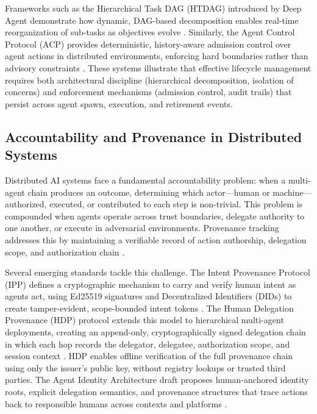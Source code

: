 Frameworks such as the Hierarchical Task DAG (HTDAG) introduced by Deep Agent demonstrate how dynamic, DAG-based decomposition enables real-time reorganization of sub-tasks as objectives evolve \cite{zhang_etal_2025_deepagent}. Similarly, the Agent Control Protocol (ACP) provides deterministic, history-aware admission control over agent actions in distributed environments, enforcing hard boundaries rather than advisory constraints \cite{ACP_2025}. These systems illustrate that effective lifecycle management requires both architectural discipline (hierarchical decomposition, isolation of concerns) and enforcement mechanisms (admission control, audit trails) that persist across agent spawn, execution, and retirement events.

\subsection{Accountability and Provenance in Distributed Systems}
\label{sec:background_provenance}

Distributed AI systems face a fundamental accountability problem: when a multi-agent chain produces an outcome, determining which actor---human or machine---authorized, executed, or contributed to each step is non-trivial. This problem is compounded when agents operate across trust boundaries, delegate authority to one another, or execute in adversarial environments. Provenance tracking addresses this by maintaining a verifiable record of action authorship, delegation scope, and authorization chain \cite{haberkamp_2025_ipp, beyer_etal_2025_agent_identity, helixar_2026_hdp}.

Several emerging standards tackle this challenge. The Intent Provenance Protocol (IPP) defines a cryptographic mechanism to carry and verify human intent as agents act, using Ed25519 signatures and Decentralized Identifiers (DIDs) to create tamper-evident, scope-bounded intent tokens \cite{haberkamp_2025_ipp}. The Human Delegation Provenance (HDP) protocol extends this model to hierarchical multi-agent deployments, creating an append-only, cryptographically signed delegation chain in which each hop records the delegator, delegatee, authorization scope, and session context \cite{helixar_2026_hdp, dibbo_etal_2026_hdp_formal}. HDP enables offline verification of the full provenance chain using only the issuer's public key, without registry lookups or trusted third parties. The Agent Identity Architecture draft proposes human-anchored identity roots, explicit delegation semantics, and provenance structures that trace actions back to responsible humans across contexts and platforms \cite{beyer_etal_2025_agent_identity}.

